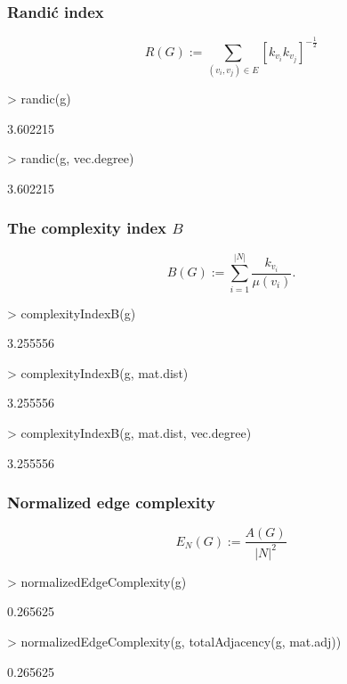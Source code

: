 \documentclass[a4paper]{article}
\begin{document}
\subsubsection*{Randi\'{c} index}
\begin{equation}
R(G):= \sum_{(v_i,v_j) \in E} [k_{v_i} k_{v_j}]^{- \frac{1}{2}}
\end{equation}
\begin{Schunk}
\begin{Sinput}
> randic(g)
\end{Sinput}
\begin{Soutput}
[1] 3.602215
\end{Soutput}
\begin{Sinput}
> randic(g, vec.degree)
\end{Sinput}
\begin{Soutput}
[1] 3.602215
\end{Soutput}
\end{Schunk}

\subsubsection*{The complexity index $B$}
\begin{equation}
B(G):= \sum_{i=1}^{|N|} \frac{k_{v_i}}{\mu(v_i)}.
\end{equation}
  

\begin{Schunk}
\begin{Sinput}
> complexityIndexB(g)
\end{Sinput}
\begin{Soutput}
[1] 3.255556
\end{Soutput}
\begin{Sinput}
> complexityIndexB(g, mat.dist)
\end{Sinput}
\begin{Soutput}
[1] 3.255556
\end{Soutput}
\begin{Sinput}
> complexityIndexB(g, mat.dist, vec.degree)
\end{Sinput}
\begin{Soutput}
[1] 3.255556
\end{Soutput}
\end{Schunk}
\subsubsection*{Normalized edge complexity}
\begin{equation}
E_N(G):=\frac{A(G)}{|N|^2}
\end{equation}
\begin{Schunk}
\begin{Sinput}
> normalizedEdgeComplexity(g)
\end{Sinput}
\begin{Soutput}
[1] 0.265625
\end{Soutput}
\begin{Sinput}
> normalizedEdgeComplexity(g, totalAdjacency(g, mat.adj))
\end{Sinput}
\begin{Soutput}
[1] 0.265625
\end{Soutput}
\end{Schunk}
\end{document}
